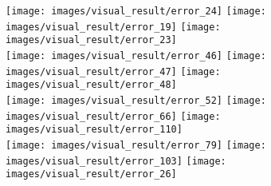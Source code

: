 \documentclass[runningheads]{llncs}
\begin{document}
\begin{figure}[htb!]
	\centering
	\texttt{[image: images/visual\_result/error\_24]}
	\texttt{[image: images/visual\_result/error\_19]}
	\texttt{[image: images/visual\_result/error\_23]}\\
	
	\texttt{[image: images/visual\_result/error\_46]}
	\texttt{[image: images/visual\_result/error\_47]}
	\texttt{[image: images/visual\_result/error\_48]}\\
	
	\texttt{[image: images/visual\_result/error\_52]}
	\texttt{[image: images/visual\_result/error\_66]}
	\texttt{[image: images/visual\_result/error\_110]}\\

	\texttt{[image: images/visual\_result/error\_79]}
	\texttt{[image: images/visual\_result/error\_103]}
	\texttt{[image: images/visual\_result/error\_26]}
	\\
	

\end{figure}
\end{document}
